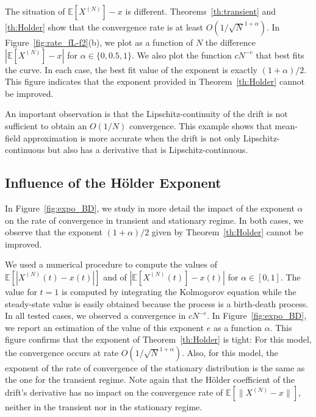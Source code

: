 \documentclass[acmlarge]{acmart}
\newcommand\XN{X^{(N)}}
\newcommand\sesp[1]{\mathbb{E}[#1]}
\newcommand\snorm[1]{\|#1\|}
\begin{document}
The situation of $\sesp{\XN}-x$ is
different. Theorems~\ref{th:transient} and \ref{th:Holder} show that
the convergence rate is at least $O(1/\sqrt{N}^{1+\alpha})$.  In
Figure~\ref{fig:rate_fL-f2}(b), we plot as a function of $N$ the
difference $|\sesp{\XN}-x|$ for $\alpha\in\{0,0.5,1\}$.  We also plot
the function $cN^{-e}$ that best fits the curve. In each case, the
best fit value of the exponent is exactly $(1+\alpha)/2$.  This figure
indicates that the exponent provided in Theorem~\ref{th:Holder} cannot
be improved.

An important observation is that the Lipschitz-continuity of the drift
is not sufficient to obtain an $O(1/N)$ convergence.  This example
shows that mean-field approximation is more accurate when the drift is
not only Lipschitz-continuous but also has a derivative that is
Lipschitz-continuous. 



\subsection{Influence of the Hölder Exponent}


In Figure~\ref{fig:expo_BD}, we study in more detail the impact of the
exponent $\alpha$ on the rate of convergence in transient and
stationary regime. In both cases, we observe that the exponent
$(1+\alpha)/2$ given by Theorem~\ref{th:Holder} cannot be improved.

We used a numerical procedure to compute the values of
$\sesp{|\XN(t)-x(t)|}$ and of $|\sesp{\XN(t)}-x(t)|$ for
$\alpha\in[0,1]$. The value for $t=1$ is computed by integrating the
Kolmogorov equation while the steady-state value is easily obtained
because the process is a birth-death process. In all tested cases, we
observed a convergence in $cN^{-e}$. In Figure~\ref{fig:expo_BD}, we
report an estimation of the value of this exponent $e$ as a function
$\alpha$.  This figure confirms that the exponent of
Theorem~\ref{th:Holder} is tight: For this model, the convergence
occurs at rate $O(1/\sqrt{N}^{1+\alpha})$.  Also, for this model, the
exponent of the rate of convergence of the stationary distribution is
the same as the one for the transient regime.  Note again that the
Hölder coefficient of the drift's derivative has no impact on the
convergence rate of $\sesp{\snorm{\XN-x}}$, neither in the transient
nor in the stationary regime.
\end{document}
